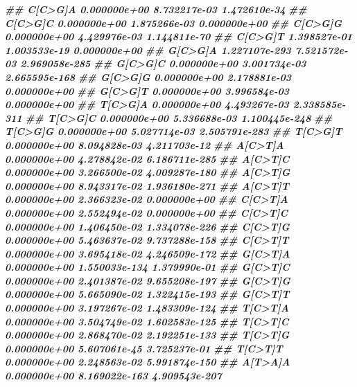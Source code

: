 \documentclass[
  12pt,
  a4paper,
  twoside]{book}
\newenvironment{Shaded}{\begin{snugshade}}{\end{snugshade}}
\newcommand{\DocumentationTok}[1]{\textcolor[rgb]{0.56,0.35,0.01}{\textbf{\textit{#1}}}}
\begin{document}
\begin{Shaded}
\begin{Highlighting}[]
\DocumentationTok{\#\# C[C\textgreater{}G]A  0.000000e+00  8.732217e{-}03  1.472610e{-}34}
\DocumentationTok{\#\# C[C\textgreater{}G]C  0.000000e+00  1.875266e{-}03  0.000000e+00}
\DocumentationTok{\#\# C[C\textgreater{}G]G  0.000000e+00  4.429976e{-}03  1.144811e{-}70}
\DocumentationTok{\#\# C[C\textgreater{}G]T  1.398527e{-}01  1.003533e{-}19  0.000000e+00}
\DocumentationTok{\#\# G[C\textgreater{}G]A 1.227107e{-}293  7.521572e{-}03 2.969058e{-}285}
\DocumentationTok{\#\# G[C\textgreater{}G]C  0.000000e+00  3.001734e{-}03 2.665595e{-}168}
\DocumentationTok{\#\# G[C\textgreater{}G]G  0.000000e+00  2.178881e{-}03  0.000000e+00}
\DocumentationTok{\#\# G[C\textgreater{}G]T  0.000000e+00  3.996584e{-}03  0.000000e+00}
\DocumentationTok{\#\# T[C\textgreater{}G]A  0.000000e+00  4.493267e{-}03 2.338585e{-}311}
\DocumentationTok{\#\# T[C\textgreater{}G]C  0.000000e+00  5.336688e{-}03 1.100445e{-}248}
\DocumentationTok{\#\# T[C\textgreater{}G]G  0.000000e+00  5.027714e{-}03 2.505791e{-}283}
\DocumentationTok{\#\# T[C\textgreater{}G]T  0.000000e+00  8.094828e{-}03  4.211703e{-}12}
\DocumentationTok{\#\# A[C\textgreater{}T]A  0.000000e+00  4.278842e{-}02 6.186711e{-}285}
\DocumentationTok{\#\# A[C\textgreater{}T]C  0.000000e+00  3.266500e{-}02 4.009287e{-}180}
\DocumentationTok{\#\# A[C\textgreater{}T]G  0.000000e+00  8.943317e{-}02 1.936180e{-}271}
\DocumentationTok{\#\# A[C\textgreater{}T]T  0.000000e+00  2.366323e{-}02  0.000000e+00}
\DocumentationTok{\#\# C[C\textgreater{}T]A  0.000000e+00  2.552494e{-}02  0.000000e+00}
\DocumentationTok{\#\# C[C\textgreater{}T]C  0.000000e+00  1.406450e{-}02 1.334078e{-}226}
\DocumentationTok{\#\# C[C\textgreater{}T]G  0.000000e+00  5.463637e{-}02 9.737288e{-}158}
\DocumentationTok{\#\# C[C\textgreater{}T]T  0.000000e+00  3.695418e{-}02 4.246509e{-}172}
\DocumentationTok{\#\# G[C\textgreater{}T]A  0.000000e+00 1.550033e{-}134  1.379990e{-}01}
\DocumentationTok{\#\# G[C\textgreater{}T]C  0.000000e+00  2.401387e{-}02 9.655208e{-}197}
\DocumentationTok{\#\# G[C\textgreater{}T]G  0.000000e+00  5.665090e{-}02 1.322415e{-}193}
\DocumentationTok{\#\# G[C\textgreater{}T]T  0.000000e+00  3.197267e{-}02 1.483309e{-}124}
\DocumentationTok{\#\# T[C\textgreater{}T]A  0.000000e+00  3.504749e{-}02 1.602583e{-}125}
\DocumentationTok{\#\# T[C\textgreater{}T]C  0.000000e+00  2.868470e{-}02 2.192251e{-}133}
\DocumentationTok{\#\# T[C\textgreater{}T]G  0.000000e+00  5.607061e{-}45  3.725237e{-}01}
\DocumentationTok{\#\# T[C\textgreater{}T]T  0.000000e+00  2.248563e{-}02 5.991874e{-}150}
\DocumentationTok{\#\# A[T\textgreater{}A]A  0.000000e+00 8.169022e{-}163 4.909543e{-}207}

\end{Highlighting}
\end{Shaded}
\end{document}
